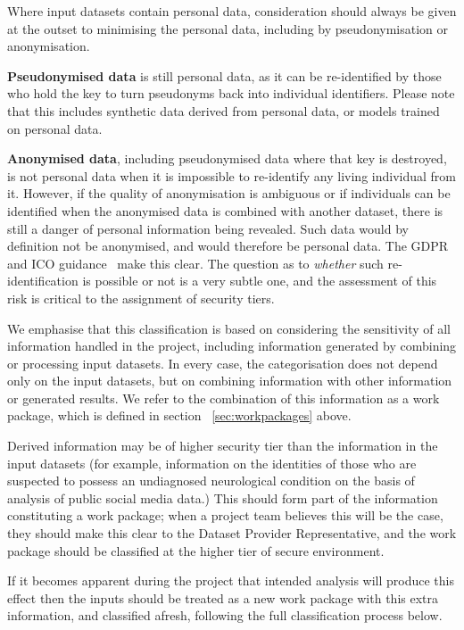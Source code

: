 \documentclass[10pt,a4paper,twocolumn]{article}
\begin{document}
Where input datasets contain personal data, consideration should always be given at the outset to minimising the personal data, including by pseudonymisation or anonymisation. 

\textbf{Pseudonymised data} is still personal data, as it can be re-identified by those who hold the key to turn pseudonyms back into individual identifiers. Please note that this includes synthetic data derived from personal data, or models trained on personal data.

\textbf{Anonymised data}, including pseudonymised data where that key is destroyed, is not personal data when it is impossible to re-identify any living individual from it. However, if the quality of anonymisation is ambiguous or if individuals can be identified when the anonymised data is combined with another dataset, there is still a danger of personal information being revealed. Such data would by definition not be anonymised, and would therefore be personal data. The GDPR~\cite{GDPR} and ICO guidance~\cite{ICOpersonaldata} make this clear. The question as to \emph{whether} such re-identification is possible or not is a very subtle one, and the assessment of this risk is critical to the assignment of security tiers.

We emphasise that this classification is based on considering the sensitivity of all information handled in the project, including information generated by
combining or processing input datasets. In every case, the categorisation does not depend only on the input datasets, but on combining information
with other information or generated results. We refer to the combination of this information as a work package, which is defined in section ~\ref{sec:workpackages} above.

Derived information may be of higher security tier than the information in the input datasets (for example, information on the identities of those who are suspected to possess an undiagnosed neurological condition on the basis of analysis of public social media data.) This should form part of the information constituting a work package; when a project team believes this will be the case, they should make this clear to the Dataset Provider Representative, and the work package should be classified at the higher tier of secure environment.

If it becomes apparent during the project that intended analysis will produce this effect then the inputs should be treated as a new work package with this extra information, and classified afresh, following the full classification process below.
\end{document}

